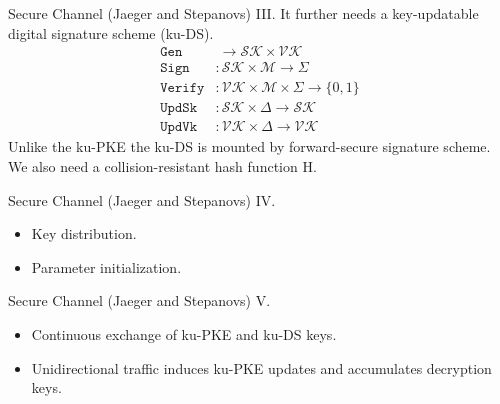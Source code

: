 \documentclass{beamer}
\begin{document}
\begin{frame}{Secure Channel (Jaeger and Stepanovs) III.}
  It further needs a key-updatable digital signature scheme (ku-DS).
  \begin{align*}
    \texttt{Gen} & \  \rightarrow \mathcal{SK} \times \mathcal{VK} \\
    \texttt{Sign} & : \mathcal{SK} \times \mathcal{M} \rightarrow \Sigma \\
    \texttt{Verify} & : \mathcal{VK} \times \mathcal{M} \times \Sigma \rightarrow \{0,1\} \\
    \texttt{UpdSk} & : \mathcal{SK} \times \Delta \rightarrow \mathcal{SK} \\
    \texttt{UpdVk} & : \mathcal{VK} \times \Delta \rightarrow \mathcal{VK}
  \end{align*}
  Unlike the ku-PKE the ku-DS is mounted by forward-secure signature scheme.
  We also need a collision-resistant hash function H.
\end{frame}

\begin{frame}{Secure Channel (Jaeger and Stepanovs) IV.}
  \scriptsize
  \begin{minipage}[h]{0.65\textwidth}
      \begin{figure}[h]
        \centering
        \setlength{\fboxsep}{10pt}
        \scalebox{0.7}{%
        \fbox{%
          
        }
      }
    \end{figure}
    \end{minipage}
  \begin{minipage}[h]{0.34\textwidth}
      \begin{itemize}
      \item Key distribution.
      \item Parameter initialization.
      \end{itemize}
    \end{minipage}
\end{frame}

\begin{frame}{Secure Channel (Jaeger and Stepanovs) V.}
  \scriptsize
  \begin{minipage}[ht]{0.59\textwidth}
      \begin{figure}[ht]
        \centering
        \setlength{\fboxsep}{10pt}
        \scalebox{0.7}{%
        \fbox{%
          
        }
      }
    \end{figure}
    \end{minipage}
  \begin{minipage}[ht]{0.40\textwidth}
      \begin{itemize}
      \item Continuous exchange of ku-PKE and ku-DS keys.
      \item Unidirectional traffic induces ku-PKE updates
        and accumulates decryption keys.
      \end{itemize}
    \end{minipage}
\end{frame}
\end{document}
